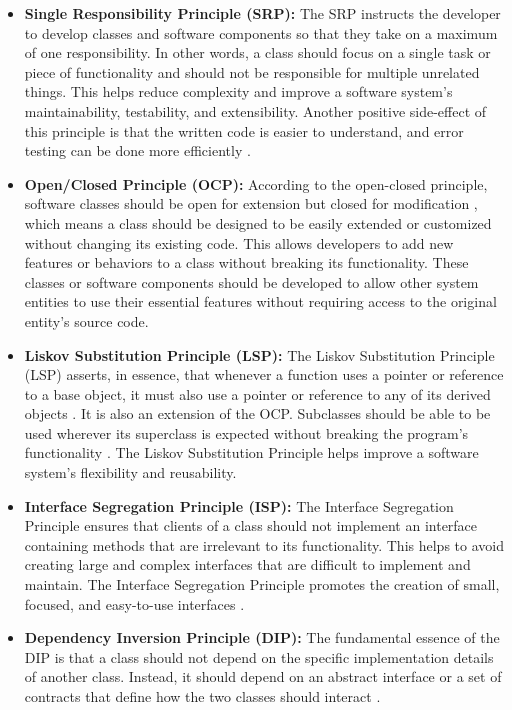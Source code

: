 \begin{itemize}
	\item \textbf{Single Responsibility Principle (SRP):}
	The SRP instructs the developer to develop classes and software components so that they take on a maximum of one responsibility. In other words, a class should focus on a single task or piece of functionality and should not be responsible for multiple unrelated things. This helps reduce complexity and improve a software system's maintainability, testability, and extensibility. Another positive side-effect of this principle is that the written code is easier to understand, and error testing can be done more efficiently \cite{.martin}.
	
	\item \textbf{Open/Closed Principle (OCP):}
	According to the open-closed principle, software classes should be open for extension but closed for modification \cite{.indeedsolid}, which means a class should be designed to be easily extended or customized without changing its existing code. This allows developers to add new features or behaviors to a class without breaking its functionality. These classes or software components should be developed to allow other system entities to use their essential features without requiring access to the original entity's source code. 
	
	\item \textbf{Liskov Substitution Principle (LSP):}
	The Liskov Substitution Principle (LSP) asserts, in essence, that whenever a function uses a pointer or reference to a base object, it must also use a pointer or reference to any of its derived objects \cite{principles}. It is also an extension of the OCP.  Subclasses should be able to be used wherever its superclass is expected without breaking the program's functionality \cite{stackify}. The Liskov Substitution Principle helps improve a software system's flexibility and reusability.
	
	\item \textbf{Interface Segregation Principle (ISP):}
	The Interface Segregation Principle ensures that clients of a class should not implement an interface containing methods that are irrelevant to its functionality. This helps to avoid creating large and complex interfaces that are difficult to implement and maintain. The Interface Segregation Principle promotes the creation of small, focused, and easy-to-use interfaces \cite{principles} \cite{.martin}. 
	
	\item \textbf{Dependency Inversion Principle (DIP):}
	The fundamental essence of the DIP is that a class should not depend on the specific implementation details of another class. Instead, it should depend on an abstract interface or a set of contracts that define how the two classes should interact \cite{principles}.
\end{itemize}

